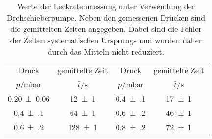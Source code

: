 \begin{table}[!h]
	\centering
	\begin{tabular}{cccc}
		\toprule
		Druck & gemittelte Zeit & Druck & gemittelte Zeit\\
		$p$/\si{mbar} & $\bar{t}$/\si{s} & $p$/\si{mbar} & $\bar{t}$/\si{s}\\
\midrule
		\num{0.20(6)} & \num{12(1)} & \num{0.4(1)} & \num{17(1)}\\
		\num{0.4(1)} & \num{64(1)} & \num{0.6(2)} & \num{46(1)}\\
		\num{0.6(2)} & \num{128(1)} & \num{0.8(2)} & \num{72(1)}\\
		\bottomrule
	\end{tabular}
	\caption{Werte der Leckratenmessung unter Verwendung der Drehschieberpumpe.
                        Neben den gemessenen Drücken sind die gemittelten Zeiten angegeben. 
                        Dabei sind die Fehler der Zeiten systematischen Ursprungs und wurden 
                        daher durch das Mitteln nicht reduziert. \label{tab:Leckratenmessung_Drehschieber_0}}
\end{table}
